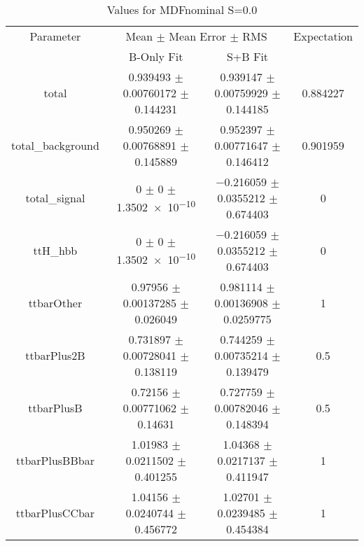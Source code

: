 \begin{table}
\centering
\caption{Values for MDFnominal S=0.0}
\begin{tabular}{cccc}
\toprule
Parameter & \multicolumn{2}{c}{Mean $\pm$ Mean Error $\pm$ RMS} & Expectation\\
 & B-Only Fit & S+B Fit & \\
\midrule
total & \num{0.939493} $\pm$ \num{0.00760172} $\pm$ \num{0.144231} & \num{0.939147} $\pm$ \num{0.00759929} $\pm$ \num{0.144185} & \num{0.884227}\\
total\_background & \num{0.950269} $\pm$ \num{0.00768891} $\pm$ \num{0.145889} & \num{0.952397} $\pm$ \num{0.00771647} $\pm$ \num{0.146412} & \num{0.901959}\\
total\_signal & \num{0} $\pm$ \num{0} $\pm$ \num{1.3502e-10} & \num{-0.216059} $\pm$ \num{0.0355212} $\pm$ \num{0.674403} & \num{0}\\
ttH\_hbb & \num{0} $\pm$ \num{0} $\pm$ \num{1.3502e-10} & \num{-0.216059} $\pm$ \num{0.0355212} $\pm$ \num{0.674403} & \num{0}\\
ttbarOther & \num{0.97956} $\pm$ \num{0.00137285} $\pm$ \num{0.026049} & \num{0.981114} $\pm$ \num{0.00136908} $\pm$ \num{0.0259775} & \num{1}\\
ttbarPlus2B & \num{0.731897} $\pm$ \num{0.00728041} $\pm$ \num{0.138119} & \num{0.744259} $\pm$ \num{0.00735214} $\pm$ \num{0.139479} & \num{0.5}\\
ttbarPlusB & \num{0.72156} $\pm$ \num{0.00771062} $\pm$ \num{0.14631} & \num{0.727759} $\pm$ \num{0.00782046} $\pm$ \num{0.148394} & \num{0.5}\\
ttbarPlusBBbar & \num{1.01983} $\pm$ \num{0.0211502} $\pm$ \num{0.401255} & \num{1.04368} $\pm$ \num{0.0217137} $\pm$ \num{0.411947} & \num{1}\\
ttbarPlusCCbar & \num{1.04156} $\pm$ \num{0.0240744} $\pm$ \num{0.456772} & \num{1.02701} $\pm$ \num{0.0239485} $\pm$ \num{0.454384} & \num{1}\\
\bottomrule
\end{tabular}
\end{table}